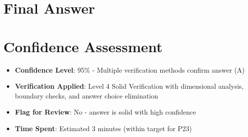 \documentclass[11pt]{article}
\begin{document}
\section*{Final Answer}

\section*{Confidence Assessment}
\begin{itemize}[leftmargin=*]
    \item \textbf{Confidence Level}: 95\% - Multiple verification methods confirm answer (A)
    \item \textbf{Verification Applied}: Level 4 Solid Verification with dimensional analysis, boundary checks, and answer choice elimination
    \item \textbf{Flag for Review}: No - answer is solid with high confidence
    \item \textbf{Time Spent}: Estimated 3 minutes (within target for P23)
\end{itemize}
\end{document}
